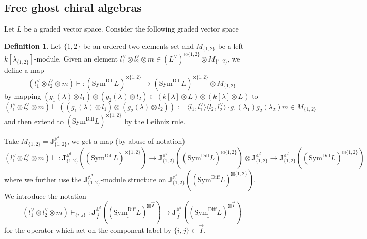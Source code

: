 \documentclass[11pt]{amsart}
\theoremstyle{definition}
\newtheorem{defn}[thm]{Definition}
\theoremstyle{remark}
\numberwithin{equation}{section}
\begin{document}
\subsection{Free ghost chiral algebras}

Let $L$ be a graded vector space. Consider the following graded vector space

\begin{defn}{\label{WickContraction}}
Let $\{1,2\}$ be an ordered two elements set and $M_{\{1,2\}}$ be a left $k[\lambda_{\{1,2\}}]$-module. Given an element $l^{\vee}_1\otimes l^{\vee}_2\otimes m\in (L^{\vee})^{\otimes \{1,2\}}\otimes M_{\{1,2\}}$, we define a map
$$
\left(l^{\vee}_1\otimes l^{\vee}_2\otimes m\right)\vdash:\left(\mathrm{Sym}^{\mathrm{Diff}}L\right)^{\otimes \{1,2\}}\rightarrow \left(\mathrm{Sym}^{\mathrm{Diff}}L\right)^{\otimes \{1,2\}}\otimes M_{\{1,2\}}
$$
    by mapping $\left(g_1(\lambda)\otimes l_1\right)\otimes \left(g_2(\lambda)\otimes l_2\right)\in \left(k[\lambda]\otimes L\right)\otimes \left(k[\lambda]\otimes L\right)$ to
    $$
    \left(l^{\vee}_1\otimes l^{\vee}_2\otimes m\right)\vdash\left(
\left(g_1(\lambda)\otimes l_1\right)\otimes \left(g_2(\lambda)\otimes l_2\right)\right):=\langle l_1,l^{\vee}_1\rangle\langle l_2,l^{\vee}_2\rangle\cdot  g_1(\lambda_1)g_2(\lambda_2)m\in M_{\{1,2\}}
$$
and then extend to $\left(\mathrm{Sym}^{\mathrm{Diff}}L\right)^{\otimes \{1,2\}}$ by the Leibniz rule.

Take $M_{\{1,2\}}=\mathbf{J}^{\mathbb{A}^d}_{\{1,2\}}$, we get a map (by abuse of notation)
$$
\left(l^{\vee}_1\otimes l^{\vee}_2\otimes m\right)\vdash:\mathbf{J}^{\mathbb{A}^d}_{\{1,2\}}\left((\underline{\mathrm{Sym}^{\mathrm{Diff}}L})^{\boxtimes\{1,2\}} \right)\rightarrow \mathbf{J}^{\mathbb{A}^d}_{\{1,2\}}\left((\underline{\mathrm{Sym}^{\mathrm{Diff}}L})^{\boxtimes\{1,2\}} \right)\otimes \mathbf{J}^{\mathbb{A}^d}_{\{1,2\}}\rightarrow \mathbf{J}^{\mathbb{A}^d}_{\{1,2\}}\left((\underline{\mathrm{Sym}^{\mathrm{Diff}}L})^{\boxtimes\{1,2\}} \right)
$$
where we further use the $\mathbf{J}^{\mathbb{A}^d}_{\{1,2\}}$-module structure on $\mathbf{J}^{\mathbb{A}^d}_{\{1,2\}}\left((\underline{\mathrm{Sym}^{\mathrm{Diff}}L})^{\boxtimes\{1,2\}} \right)$.  We introduce the notation
$$
\left(l^{\vee}_1\otimes l^{\vee}_2\otimes m\right)\vdash_{\{i,j\}}:\mathbf{J}^{\mathbb{A}^d}_{\overrightarrow{I}}\left((\underline{\mathrm{Sym}^{\mathrm{Diff}}L})^{\boxtimes \overrightarrow{I}} \right)\rightarrow \mathbf{J}^{\mathbb{A}^d}_{\overrightarrow{I}}\left((\underline{\mathrm{Sym}^{\mathrm{Diff}}L})^{\boxtimes\overrightarrow{I}} \right)
$$
for the operator which act on the component label by $\{i,j\}\subset \overrightarrow{I}$.




\end{defn}
\end{document}
